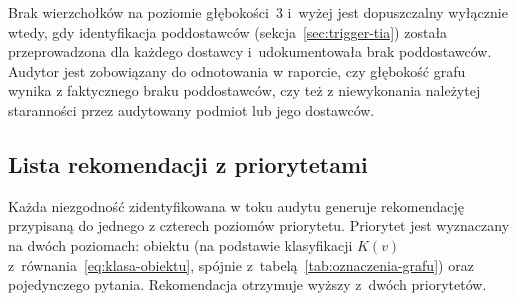 Brak wierzchołków na poziomie głębokości~3 i~wyżej jest dopuszczalny wyłącznie wtedy, gdy identyfikacja poddostawców (sekcja~\ref{sec:trigger-tia}) została przeprowadzona dla każdego dostawcy i~udokumentowała brak poddostawców. Audytor jest zobowiązany do odnotowania w raporcie, czy głębokość grafu wynika z faktycznego braku poddostawców, czy też z niewykonania należytej staranności przez audytowany podmiot lub jego dostawców.

\subsection{Lista rekomendacji z priorytetami}
\label{sec:rekomendacje}

Każda niezgodność zidentyfikowana w toku audytu
generuje rekomendację przypisaną do jednego
z czterech poziomów priorytetu. Priorytet jest wyznaczany
na dwóch poziomach: obiektu (na podstawie klasyfikacji
$K(v)$ z~równania~\eqref{eq:klasa-obiektu}, spójnie
z~tabelą~\ref{tab:oznaczenia-grafu}) oraz pojedynczego pytania.
Rekomendacja otrzymuje wyższy z~dwóch priorytetów.

